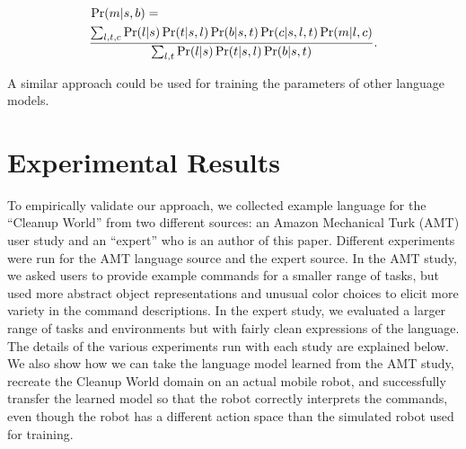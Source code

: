 \documentclass[conference]{IEEEtran}
\begin{document}
{
\footnotesize
\begin{equation}
\vspace{-1em}
\begin{split}
& \Pr(m | s, b) = \\ & \frac{\sum_{l,t,c} \Pr(l | s) \Pr(t | s, l) \Pr(b | s, t) \Pr(c | s, l, t) \Pr(m | l, c)}{\sum_{l,t} \Pr(l | s) \Pr(t | s, l) \Pr(b | s, t)}.
\end{split}
\end{equation}
}




\noindent A similar approach could be used for training the parameters of other language models.

\section{Experimental Results}
To empirically validate our approach, we collected example language for the ``Cleanup World'' from two different sources: an Amazon Mechanical Turk (AMT) user study and an ``expert'' who is an author of this paper. Different experiments were run for the AMT language source and the expert source. In the AMT study, we asked users to provide example commands for a smaller range of tasks, but used more abstract object representations and unusual color choices to elicit more variety in the command descriptions. In the expert study, we evaluated a larger range of tasks and environments but with fairly clean expressions of the language. The details of the various experiments run with each study are explained below. We also show how we can take the language model learned from the AMT study, recreate the Cleanup World domain on an actual mobile robot, and successfully transfer the learned model so that the robot correctly interprets the commands, even though the robot has a different action space than the simulated robot used for training.
\end{document}
